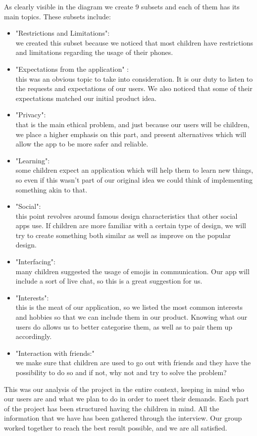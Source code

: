 \documentclass[12pt]{report}
\begin{document}
  As clearly visible in the diagram we create 9 subsets and each of them has its
  main topics. These subsets include:
	\begin{itemize}
		\item "Restrictions and Limitations":\\
		       we created this subset because we noticed that most children have
					 restrictions and limitations regarding the usage of their phones.
		\item "Expectations from the application" :\\
		       this was an obvious topic to take into consideration. It is our duty to listen to the requests and expectations of our users. 
					 We also noticed that some of their expectations matched our initial product idea.
		\item "Privacy":\\
		       that is the main ethical problem, and just because our users will be children,
					 we place a higher emphasis on this part, and present alternatives which will allow the app to be more safer and reliable.
		\item "Learning":\\
		       some children expect an application which will help them to learn new things, so even if this wasn't
					 part of our original idea we could think of implementing something akin to that.
		\item "Social":\\
		       this point revolves around famous design characteristics that other social apps use. If children are more familiar
					 with a certain type of design, we will try to create something both similar as well as improve on the popular design.
		\item "Interfacing":\\
		       many children suggested the usage of emojis in communication. Our app will include a sort
					 of live chat, so this is a great suggestion for us.
		\item "Interests":\\
		       this is the meat of our application, so we listed the most common interests and hobbies
					 so that we can include them in our product. Knowing what our users do allows us to better categorise them, as well as to pair them up accordingly.
		\item "Interaction with friends:"\\
		       we make sure that children are used to go out with friends and they have the possibility to do
					 so and if not, why not and try to solve the problem?

	\end{itemize}

	 This was our analysis of the project in the entire context, keeping in mind who our users are and what we
	 plan to do in order to meet their demands. Each part of the project has been structured having the children in mind. All the information that we have has been gathered through the interview. Our group worked together to reach the best result possible, and we are all satisfied.

	
\end{document}
